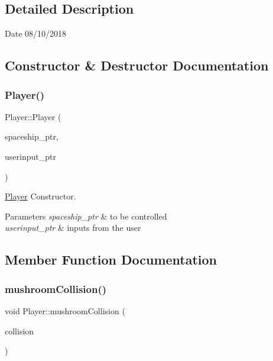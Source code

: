 \subsection{Detailed Description}
\begin{DoxyDate}{Date}
08/10/2018 
\end{DoxyDate}


\subsection{Constructor \& Destructor Documentation}
\mbox{\label{class_player_a009b5a37492c5b8e07e09a29a00ea776}} 
\subsubsection{\texorpdfstring{Player()}{Player()}}
{\footnotesize\ttfamily Player\+::\+Player (\begin{DoxyParamCaption}\item[{shared\+\_\+ptr$<$ \mbox{\hyperlink{class_spaceship}{Spaceship}} $>$}]{spaceship\+\_\+ptr,  }\item[{shared\+\_\+ptr$<$ \mbox{\hyperlink{class_user_inputs}{User\+Inputs}} $>$}]{userinput\+\_\+ptr }\end{DoxyParamCaption})\hspace{0.3cm}{\ttfamily [inline]}}



\mbox{\hyperlink{class_player}{Player}} Constructor. 


\begin{DoxyParams}{Parameters}
{\em spaceship\+\_\+ptr} & to be controlled \\
\hline
{\em userinput\+\_\+ptr} & inputs from the user \\
\hline
\end{DoxyParams}


\subsection{Member Function Documentation}
\mbox{\label{class_player_acaa4c1b39f725f0de4b2b3d39bc34dd3}} 
\subsubsection{\texorpdfstring{mushroom\+Collision()}{mushroomCollision()}}
{\footnotesize\ttfamily void Player\+::mushroom\+Collision (\begin{DoxyParamCaption}\item[{bool}]{collision }\end{DoxyParamCaption})}




